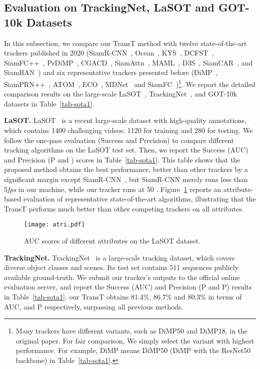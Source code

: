 \documentclass[final]{cvpr}
\begin{document}
\subsection{Evaluation on TrackingNet, LaSOT and GOT-10k Datasets}
In this subsection, we compare our TransT method with twelve state-of-the-art trackers 
published in 2020 (SiamR-CNN~\cite{SiamRCNN}, Ocean~\cite{Ocean}, KYS~\cite{KYS}, DCFST~\cite{DCFST}, 
SiamFC++~\cite{SiamFC++}, PrDiMP~\cite{PrDiMP}, CGACD~\cite{CGACD}, SiamAttn~\cite{DSA}, MAML~\cite{MAML}, D3S~\cite{D3S}, 
SiamCAR~\cite{SiamCAR}, and SiamBAN~\cite{SiamBAN}) and six representative trackers presented before (DiMP~\cite{DiMP}, 
SiamPRN++~\cite{SiamRPNplusplus}, ATOM~\cite{ATOM}, ECO~\cite{ECO}, MDNet~\cite{MDNet} and 
SiamFC~\cite{SiameseFC})\footnote{Many trackers have different variants, such as DiMP50 and DiMP18, 
in the original paper. For fair comparison, We simply select the variant with highest performance. 
For example, DiMP means DiMP50 (DiMP with the ResNet50 backbone) in Table~\ref{tab-sota1}.}.
We report the detailed comparison results on the large-scale LaSOT~\cite{LaSOT}, TrackingNet~\cite{trackingnet}, and 
GOT-10k~\cite{GOT10K} datasets in Table~\ref{tab-sota1}. 

{\noindent \textbf{LaSOT. }} LaSOT~\cite{LaSOT} is a recent large-scale dataset with 
high-quality annotations, which contains 1400 challenging videos: 1120 for training and 280 for testing.  
We follow the one-pass evaluation (Success and Precision) to compare different tracking algorithms on the 
LaSOT test set. 
Then, we report the Success (AUC) and Precision (P and ) scores in Table~\ref{tab-sota1}. 
This table shows that the proposed method obtains the best performance, better than other trackers by a significant margin except SiamR-CNN~\cite{SiamRCNN}, but SiamR-CNN merely runs less than 5\emph{fps} in our machine, while our tracker runs at 50 .
Figure~\ref{fig:lasotatt} reports an attribute-based evaluation of representative state-of-the-art algorithms, 
illustrating that the TransT performs much better than other competing trackers on all attributes. 

\begin{figure}
\centering
    \texttt{[image: atri.pdf]}
    \caption{AUC scores of different attributes on the LaSOT dataset.}
    \label{fig:lasotatt}
\end{figure} 

{\noindent \textbf{TrackingNet. }} TrackingNet~\cite{trackingnet} is a large-scale tracking dataset, 
which covers diverse object classes and scenes. Its test set contains 511 sequences publicly available
ground-truth. 
We submit our tracker's outputs to the official online evaluation server, and report the Success (AUC) 
and Precision (P and P) results in Table~\ref{tab-sota1}.
our TransT obtains 81.4\%, 86.7\% and 80.3\% in terms of AUC,  and P respectively, 
surpassing all previous methods. 
\end{document}
